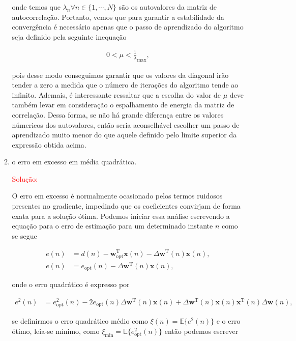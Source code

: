 \documentclass[a4paper,10pt]{article}
\begin{document}
\begin{enumerate}
\begin{enumerate}
						onde temos que $\lambda_{n} \forall n \in \{1, \cdots, N\}$ são os autovalores da matriz de autocorrelação. Portanto, vemos que para garantir a estabilidade da convergência é necessário 
						apenas que o passo de aprendizado do algoritmo seja definido pela seguinte inequação

						\begin{align}
							0 < \mu < \frac{1}{\lambda}_{\text{max}},
						\end{align}

						pois desse modo conseguimos garantir que os valores da diagonal irão tender a zero a medida que o número de iterações do algoritmo tende ao infinito. Ademais, é interessante ressaltar que a escolha 
						do valor de $\mu$ deve também levar em consideração o espalhamento de energia da matriz de correlação. Dessa forma, se não há grande diferença entre
						os valores númericos dos autovalores, então seria aconselhável escolher um passo de aprendizado muito menor do que aquele definido pelo limite superior da expressão obtida acima.
						
						\item o erro em excesso em média quadrática. 
					
						\textcolor{red}{Solução:}
						
						O erro em excesso é normalmente ocasionado pelos termos ruidosos presentes no gradiente, impedindo que os coeficientes convirjam de forma exata para a solução ótima. 
						Podemos iniciar essa análise escrevendo a equação para o erro de estimação para um determinado instante $n$ como se segue

						\begin{align}
							e(n) &= d(n) - \mathbf{w}^{\text{T}}_{\text{opt}} \mathbf{x}(n) - \Delta \mathbf{w}^{\text{T}}(n) \mathbf{x}(n), \\
							e(n) &= e_{\text{opt}}(n) - \Delta \mathbf{w}^{\text{T}}(n) \mathbf{x}(n),
						\end{align}

						onde o erro quadrático é expresso por

						\begin{align}
							e^{2}(n) &= e^{2}_{\text{opt}}(n) - 2 e_{\text{opt}}(n) \Delta \mathbf{w}^{\text{T}}(n) \mathbf{x}(n) + \Delta \mathbf{w}^{\text{T}}(n) \mathbf{x}(n) \mathbf{x}^{\text{T}}(n) \Delta \mathbf{w}(n) ,
						\end{align}

						se definirmos o erro quadrático médio como $\xi(n) = \mathbb{E}\{e^{2}(n)\}$ e o erro ótimo, leia-se mínimo, como $\xi_{\text{min}} = \mathbb{E}\{e^{2}_{\text{opt}}(n)\}$
						então podemos escrever
						

\end{enumerate}
\end{enumerate}
\end{document}
